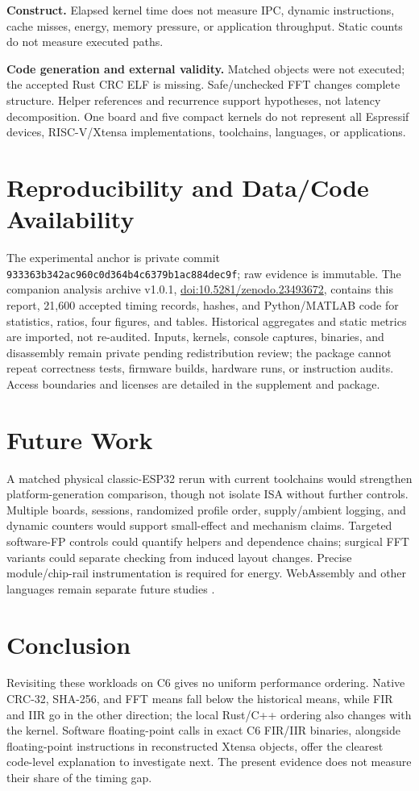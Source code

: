 \documentclass[10pt]{article}
\begin{document}
\textbf{Construct.} Elapsed kernel time does not measure IPC, dynamic instructions, cache misses, energy, memory pressure, or application throughput. Static counts do not measure executed paths.

\textbf{Code generation and external validity.} Matched objects were not executed; the accepted Rust CRC ELF is missing. Safe/unchecked FFT changes complete structure. Helper references and recurrence support hypotheses, not latency decomposition. One board and five compact kernels do not represent all Espressif devices, RISC-V/Xtensa implementations, toolchains, languages, or applications.

\section{Reproducibility and Data/Code Availability}
The experimental anchor is private commit \texttt{933363b342ac960c0d364b4c6379b1ac884dec9f}; raw evidence is immutable. The companion analysis archive v1.0.1, \href{https://doi.org/10.5281/zenodo.23493672}{doi:10.5281/zenodo.23493672}, contains this report, 21,600 accepted timing records, hashes, and Python/MATLAB code for statistics, ratios, four figures, and tables. Historical aggregates and static metrics are imported, not re-audited. Inputs, kernels, console captures, binaries, and disassembly remain private pending redistribution review; the package cannot repeat correctness tests, firmware builds, hardware runs, or instruction audits. Access boundaries and licenses are detailed in the supplement and package.

\section{Future Work}
A matched physical classic-ESP32 rerun with current toolchains would strengthen platform-generation comparison, though not isolate ISA without further controls. Multiple boards, sessions, randomized profile order, supply/ambient logging, and dynamic counters would support small-effect and mechanism claims. Targeted software-FP controls could quantify helpers and dependence chains; surgical FFT variants could separate checking from induced layout changes. Precise module/chip-rail instrumentation is required for energy. WebAssembly and other languages remain separate future studies \citep{wallentowitz2022wasm,moron2023wasmjit}.

\section{Conclusion}
Revisiting these workloads on C6 gives no uniform performance ordering. Native CRC-32, SHA-256, and FFT means fall below the historical means, while FIR and IIR go in the other direction; the local Rust/C++ ordering also changes with the kernel. Software floating-point calls in exact C6 FIR/IIR binaries, alongside floating-point instructions in reconstructed Xtensa objects, offer the clearest code-level explanation to investigate next. The present evidence does not measure their share of the timing gap.
\end{document}

